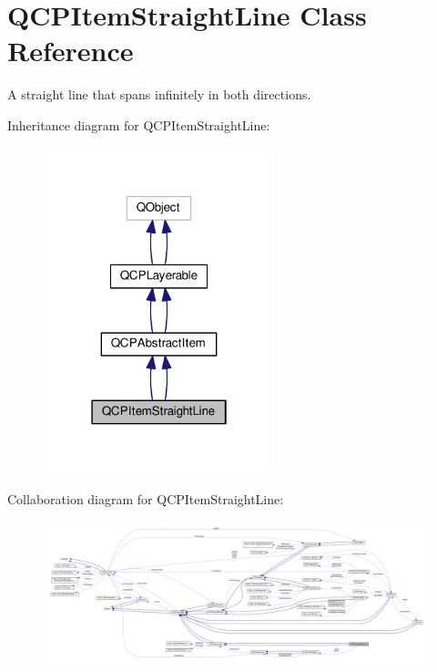 \hypertarget{class_q_c_p_item_straight_line}{}\section{Q\+C\+P\+Item\+Straight\+Line Class Reference}
\label{class_q_c_p_item_straight_line}


A straight line that spans infinitely in both directions.  




Inheritance diagram for Q\+C\+P\+Item\+Straight\+Line\+:\nopagebreak
\begin{figure}[H]
\begin{center}
\leavevmode
\includegraphics[width=190pt]{class_q_c_p_item_straight_line__inherit__graph}
\end{center}
\end{figure}


Collaboration diagram for Q\+C\+P\+Item\+Straight\+Line\+:\nopagebreak
\begin{figure}[H]
\begin{center}
\leavevmode
\includegraphics[width=350pt]{class_q_c_p_item_straight_line__coll__graph}
\end{center}
\end{figure}
